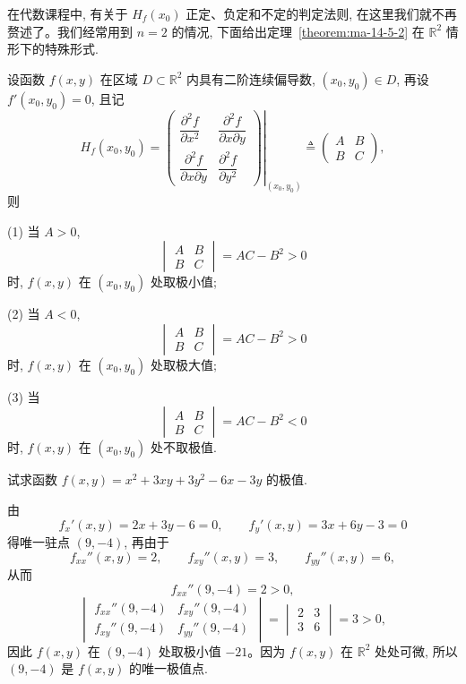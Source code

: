 在代数课程中, 有关于 $H_f(x_0)$ 正定、负定和不定的判定法则, 在这里我们就不再赘述了。我们经常用到 $n=2$ 的情况, 下面给出定理~\ref{theorem:ma-14-5-2} 在 $\mathbb R^2$ 情形下的特殊形式.

\begin{corollary}\label{corollary:ma-14-source-101}
设函数 $f(x,y)$ 在区域 $D\subset\mathbb R^2$ 内具有二阶连续偏导数, $(x_0,y_0)\in D$, 再设 $f'(x_0,y_0)=0$, 且记
\[
  H_f(x_0,y_0)
  =
  \left.
  \begin{pmatrix}
    \dfrac{\partial^2 f}{\partial x^2} &
    \dfrac{\partial^2 f}{\partial x\partial y}\\
    \dfrac{\partial^2 f}{\partial x\partial y} &
    \dfrac{\partial^2 f}{\partial y^2}
  \end{pmatrix}
  \right|_{(x_0,y_0)}
  \triangleq
  \begin{pmatrix}
    A & B\\
    B & C
  \end{pmatrix},
\]
则
\end{corollary}

\noindent (1) 当 $A>0$,
\[
  \begin{vmatrix}
    A & B\\
    B & C
  \end{vmatrix}
  =AC-B^2>0
\]
时, $f(x,y)$ 在 $(x_0,y_0)$ 处取极小值;

\noindent (2) 当 $A<0$,
\[
  \begin{vmatrix}
    A & B\\
    B & C
  \end{vmatrix}
  =AC-B^2>0
\]
时, $f(x,y)$ 在 $(x_0,y_0)$ 处取极大值;

\noindent (3) 当
\[
  \begin{vmatrix}
    A & B\\
    B & C
  \end{vmatrix}
  =AC-B^2<0
\]
时, $f(x,y)$ 在 $(x_0,y_0)$ 处不取极值.

\begin{example}\label{example:ma-14-5-1}
试求函数 $f(x,y)=x^2+3xy+3y^2-6x-3y$ 的极值.
\end{example}


\begin{solve}
由
\[
  f_x'(x,y)=2x+3y-6=0,\qquad
  f_y'(x,y)=3x+6y-3=0
\]
得唯一驻点 $(9,-4)$, 再由于
\[
  f_{xx}''(x,y)=2,\qquad f_{xy}''(x,y)=3,\qquad f_{yy}''(x,y)=6,
\]
从而
\[
  f_{xx}''(9,-4)=2>0,
\]
\[
  \begin{vmatrix}
    f_{xx}''(9,-4) & f_{xy}''(9,-4)\\
    f_{xy}''(9,-4) & f_{yy}''(9,-4)
  \end{vmatrix}
  =
  \begin{vmatrix}
    2 & 3\\
    3 & 6
  \end{vmatrix}
  =3>0,
\]
因此 $f(x,y)$ 在 $(9,-4)$ 处取极小值 $-21$。因为 $f(x,y)$ 在 $\mathbb R^2$ 处处可微, 所以 $(9,-4)$ 是 $f(x,y)$ 的唯一极值点.
\end{solve}


